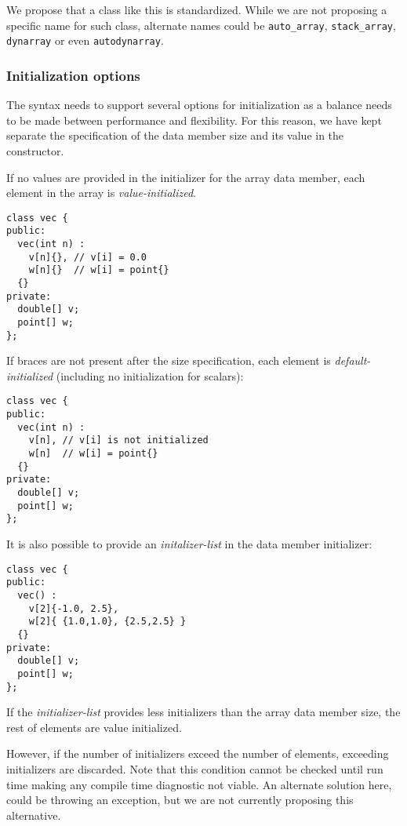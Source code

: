 We propose that a class like this is standardized. While we are not proposing a
specific name for such class, alternate names could be \verb+auto_array+,
\verb+stack_array+, \verb+dynarray+ or even \verb+autodynarray+.


\subsubsection{Initialization options}

The syntax needs to support several options for initialization as a balance
needs to be made between performance and flexibility. For this reason, we have
kept separate the specification of the data member size and its value in the
constructor.

If no values are provided in the initializer for the array data member, each
element in the array is \emph{value-initialized}.

\begin{lstlisting}
class vec {
public:
  vec(int n) : 
    v[n]{}, // v[i] = 0.0
    w[n]{}  // w[i] = point{}
  {}
private:
  double[] v;
  point[] w;
};
\end{lstlisting}

If braces are not present after the size specification, each element is
\emph{default-initialized} (including no initialization for scalars):


\begin{lstlisting}
class vec {
public:
  vec(int n) : 
    v[n], // v[i] is not initialized
    w[n]  // w[i] = point{}
  {}
private:
  double[] v;
  point[] w;
};
\end{lstlisting}

It is also possible to provide an \emph{initalizer-list} in the data member initializer:

\begin{lstlisting}
class vec {
public:
  vec() : 
    v[2]{-1.0, 2.5}, 
    w[2]{ {1.0,1.0}, {2.5,2.5} }
  {}
private:
  double[] v;
  point[] w;
};
\end{lstlisting}

If the \emph{initializer-list} provides less initializers than the array data member
size, the rest of elements are value initialized. 

However, if the number of
initializers exceed the number of elements, exceeding initializers are
discarded. Note that this condition cannot be checked until run time making any
compile time diagnostic not viable. An alternate solution here, could be
throwing an exception, but we are not currently proposing this alternative.

